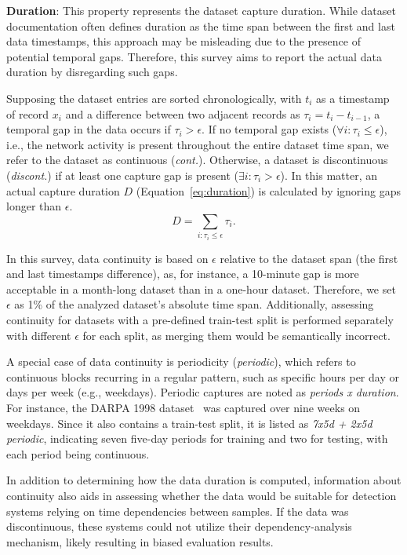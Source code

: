 \textbf{Duration}: This property represents the dataset capture duration. While dataset documentation often defines duration as the time span between the first and last data timestamps, this approach may be misleading due to the presence of potential temporal gaps. Therefore, this survey aims to report the actual data duration by disregarding such gaps.

Supposing the dataset entries are sorted chronologically, with $t_i$ as a timestamp of record $x_i$ and a difference between two adjacent records as $\tau_i = t_i - t_{i-1}$, a temporal gap in the data occurs if $\tau_i > \epsilon$. If no temporal gap exists ($\forall i: \tau_i \leq \epsilon$), i.e., the network activity is present throughout the entire dataset time span, we refer to the dataset as continuous (\emph{cont.}). Otherwise, a dataset is discontinuous (\emph{discont.}) if at least one capture gap is present ($\exists i: \tau_i > \epsilon$). In this matter, an actual capture duration $D$ (Equation~\ref{eq:duration}) is calculated by ignoring gaps longer than $\epsilon$.
\begin{equation}
    D = \sum\limits_{i: \tau_i \leq \epsilon} \tau_i.
    \label{eq:duration}
\end{equation}

In this survey, data continuity is based on $\epsilon$ relative to the dataset span (the first and last timestamps difference), as, for instance, a 10-minute gap is more acceptable in a month-long dataset than in a one-hour dataset. Therefore, we set $\epsilon$ as 1\% of the analyzed dataset's absolute time span. Additionally, assessing continuity for datasets with a pre-defined train-test split is performed separately with different $\epsilon$ for each split, as merging them would be semantically incorrect.

A special case of data continuity is periodicity (\emph{periodic}), which refers to continuous blocks recurring in a regular pattern, such as specific hours per day or days per week (e.g., weekdays). Periodic captures are noted as \emph{periods x duration}. For instance, the DARPA 1998 dataset~\cite{lippmann2000_darpa1998} was captured over nine weeks on weekdays. Since it also contains a train-test split, it is listed as \emph{7x5d + 2x5d periodic}, indicating seven five-day periods for training and two for testing, with each period being continuous.

In addition to determining how the data duration is computed, information about continuity also aids in assessing whether the data would be suitable for detection systems relying on time dependencies between samples. If the data was discontinuous, these systems could not utilize their dependency-analysis mechanism, likely resulting in biased evaluation results.

